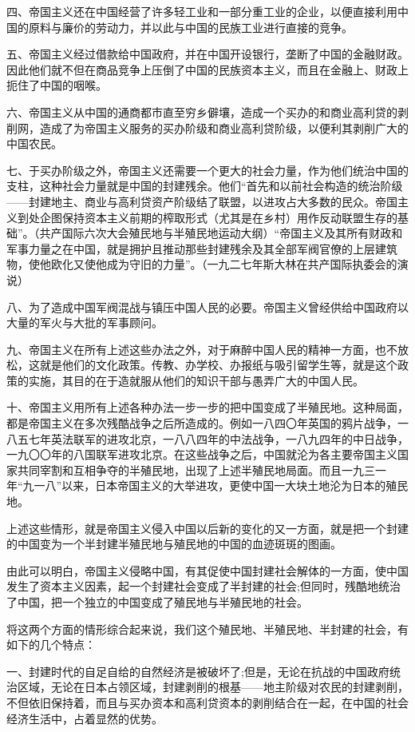 四、帝国主义还在中国经营了许多轻工业和一部分重工业的企业，以便直接利用中国的原料与廉价的劳动力，并以此与中国的民族工业进行直接的竞争。

五、帝国主义经过借款给中国政府，并在中国开设银行，垄断了中国的金融财政。因此他们就不但在商品竞争上压倒了中国的民族资本主义，而且在金融上、财政上扼住了中国的咽喉。

六、帝国主义从中国的通商都市直至穷乡僻壤，造成一个买办的和商业高利贷的剥削网，造成了为帝国主义服务的买办阶级和商业高利贷阶级，以便利其剥削广大的中国农民。

七、于买办阶级之外，帝国主义还需要一个更大的社会力量，作为他们统治中国的支柱，这种社会力量就是中国的封建残余。他们“首先和以前社会构造的统治阶级——封建地主、商业与高利贷资产阶级结了联盟，以进攻占大多数的民众。帝国主义到处企图保持资本主义前期的榨取形式（尤其是在乡村）用作反动联盟生存的基础”。（共产国际六次大会殖民地与半殖民地运动大纲）“帝国主义及其所有财政和军事力量之在中国，就是拥护且推动那些封建残余及其全部军阀官僚的上层建筑物，使他欧化又使他成为守旧的力量”。（一九二七年斯大林在共产国际执委会的演说）

八、为了造成中国军阀混战与镇压中国人民的必要。帝国主义曾经供给中国政府以大量的军火与大批的军事顾问。

九、帝国主义在所有上述这些办法之外，对于麻醉中国人民的精神一方面，也不放松，这就是他们的文化政策。传教、办学校、办报纸与吸引留学生等，就是这个政策的实施，其目的在于造就服从他们的知识干部与愚弄广大的中国人民。

十、帝国主义用所有上述各种办法一步一步的把中国变成了半殖民地。这种局面，都是帝国主义在多次残酷战争之后所造成的。例如一八四〇年英国的鸦片战争，一八五七年英法联军的进攻北京，一八八四年的中法战争，一八九四年的中日战争，一九〇〇年的八国联军进攻北京。在这些战争之后，中国就沦为各主要帝国主义国家共同宰割和互相争夺的半殖民地，出现了上述半殖民地局面。而且一九三一年“九一八”以来，日本帝国主义的大举进攻，更使中国一大块土地沦为日本的殖民地。

上述这些情形，就是帝国主义侵入中国以后新的变化的又一方面，就是把一个封建的中国变为一个半封建半殖民地与殖民地的中国的血迹斑斑的图画。

由此可以明白，帝国主义侵略中国，有其促使中国封建社会解体的一方面，使中国发生了资本主义因素，起一个封建社会变成了半封建的社会;但同时，残酷地统治了中国，把一个独立的中国变成了殖民地与半殖民地的社会。

将这两个方面的情形综合起来说，我们这个殖民地、半殖民地、半封建的社会，有如下的几个特点：

一、封建时代的自足自给的自然经济是被破坏了;但是，无论在抗战的中国政府统治区域，无论在日本占领区域，封建剥削的根基——地主阶级对农民的封建剥削，不但依旧保持着，而且与买办资本和高利贷资本的剥削结合在一起，在中国的社会经济生活中，占着显然的优势。

